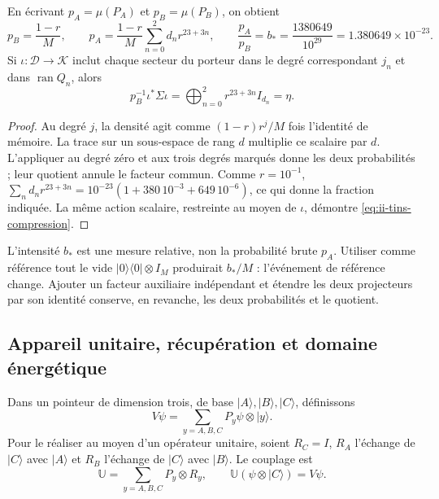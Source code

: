 \begin{samepage}
\begin{proposition}
\label{prop:ii-tins-relative}
En écrivant $p_A=\mu(P_A)$ et $p_B=\mu(P_B)$, on obtient
\begin{equation}
 p_B=\frac{1-r}{M},\qquad
 p_A=\frac{1-r}{M}\sum_{n=0}^2d_nr^{23+3n},\qquad
 \frac{p_A}{p_B}=b_*=
 \frac{1380649}{10^{29}}=1.380649\times10^{-23}.
 \label{eq:ii-tins-relative}
\end{equation}
Si $\iota:\mathcal D\to\mathcal K$ inclut chaque secteur du porteur
dans le degré correspondant $j_n$ et dans $\operatorname{ran}Q_n$, alors
\begin{equation}
 p_B^{-1}\iota^*\Sigma\iota
 =\bigoplus_{n=0}^2r^{23+3n}I_{d_n}=\eta.
 \label{eq:ii-tins-compression}
\end{equation}
\end{proposition}
\end{samepage}
\begin{proof}
Au degré $j$, la densité agit comme $(1-r)r^j/M$ fois l’identité
de mémoire. La trace sur un sous-espace de rang $d$ multiplie ce
scalaire par $d$. L’appliquer au degré zéro et aux trois degrés marqués
donne les deux probabilités ; leur quotient annule le facteur commun.
Comme $r=10^{-1}$,
$\sum_nd_nr^{23+3n}=10^{-23}(1+380\,10^{-3}+649\,10^{-6})$,
ce qui donne la fraction indiquée. La même action scalaire, restreinte au moyen de
$\iota$, démontre \eqref{eq:ii-tins-compression}.
\end{proof}

L’intensité $b_*$ est une mesure relative, non la probabilité brute $p_A$.
Utiliser comme référence tout le vide $|0\rangle\langle0|\otimes I_M$
produirait $b_*/M$ : l’événement de référence change. Ajouter un facteur auxiliaire
indépendant et étendre les deux projecteurs par son identité conserve, en
revanche, les deux probabilités et le quotient.

\subsection{Appareil unitaire, récupération et domaine énergétique}
\label{subsec:ii-tins-aparato}

Dans un pointeur de dimension trois, de base $|A\rangle,|B\rangle,|C\rangle$,
définissons
\begin{equation}
 V\psi=\sum_{y=A,B,C}P_y\psi\otimes|y\rangle.
 \label{eq:ii-tins-isometry}
\end{equation}
Pour le réaliser au moyen d’un opérateur unitaire, soient $R_C=I$, $R_A$ l’échange
de $|C\rangle$ avec $|A\rangle$ et $R_B$ l’échange de $|C\rangle$
avec $|B\rangle$. Le couplage est
\begin{equation}
 \mathbb U=\sum_{y=A,B,C}P_y\otimes R_y,
 \qquad \mathbb U(\psi\otimes|C\rangle)=V\psi.
 \label{eq:ii-tins-unitary}
\end{equation}

